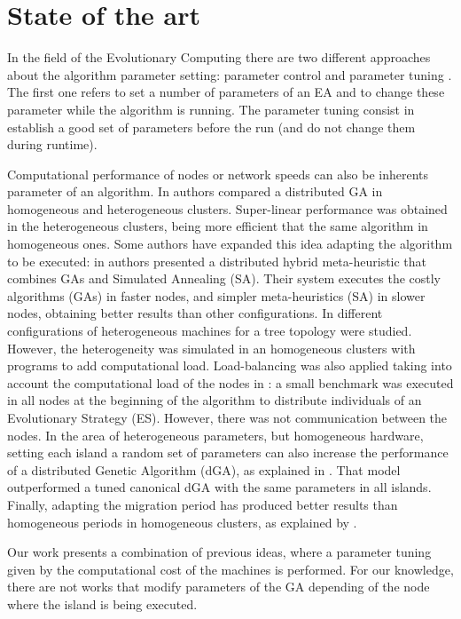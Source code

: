 %
\section{State of the art}
\label{sec:soa}
%

In the field of the Evolutionary Computing there are two different approaches about the algorithm parameter setting: parameter control and parameter tuning \cite{PARAMETERTUNING}. The first one refers to set a number of parameters of an EA and to change these parameter while the algorithm is running. The parameter tuning consist in establish a good set of parameters before the run (and do not change them during runtime).

 Computational performance of nodes or network speeds can also be inherents parameter of an algorithm. In \cite{HETEROGENEOUSHARD} authors compared a distributed GA in homogeneous and heterogeneous clusters. Super-linear performance was obtained in the heterogeneous clusters, being more efficient that the same algorithm in homogeneous ones. Some authors have expanded this idea adapting the algorithm to be executed: in \cite{HYDROCM} authors presented a distributed hybrid meta-heuristic that combines GAs and Simulated Annealing (SA). Their system executes the costly algorithms (GAs) in faster nodes, and simpler meta-heuristics (SA) in slower nodes, obtaining better results than other configurations. In \cite{HETEROGENEOUSTOPOLOGY} different configurations of heterogeneous machines for a tree topology were studied. However, the heterogeneity was simulated in an homogeneous clusters with programs to add computational load. Load-balancing was also applied taking into account the computational load of the nodes in \cite{PARALLELIMPLEMENTATION}: a small benchmark was executed in all nodes at the beginning of the algorithm to distribute individuals of an Evolutionary Strategy (ES). However, there was not communication between the nodes. In the area of heterogeneous parameters, but homogeneous hardware, setting each island a random set of parameters can also increase the performance of a distributed Genetic Algorithm (dGA), as explained in \cite{HETEROGENEOUSPARAMETERS}. That model outperformed a tuned canonical dGA with the same parameters in all islands. Finally, adapting the migration period has produced better results than homogeneous periods in homogeneous clusters, as explained by \cite{HETEROGENEOUSMIGRATION}.

 Our work presents a combination of previous ideas, where a parameter tuning given by the computational cost of the machines is performed. For our knowledge, there are not works that modify parameters of the GA depending of the node where the island is being executed.

